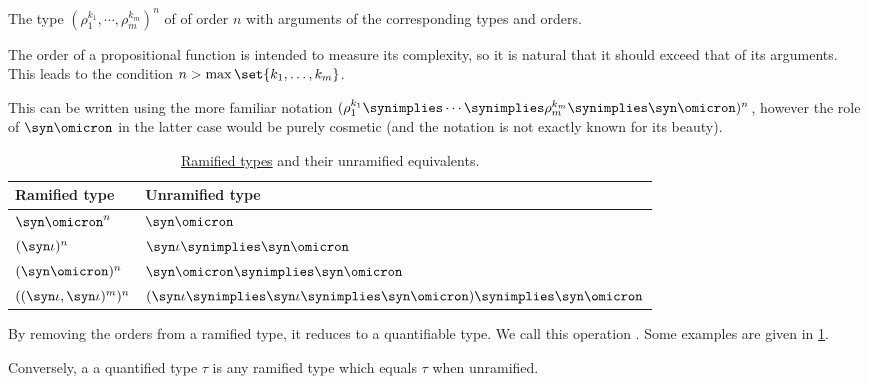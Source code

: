 \begin{definition}
\begin{thmenum}
\begin{thmenum}
       The type \( (\rho_1^{k_1}, \cdots, \rho_m^{k_m})^n \) of  of order \( n \) with arguments of the corresponding types and orders.

      The order of a propositional function is intended to measure its complexity, so it is natural that it should exceed that of its arguments. This leads to the condition \( n > \max\set{ k_1, \ldots, k_m } \).

      This can be written using the more familiar notation \( (\rho_1^{k_1} \synimplies \cdots \synimplies \rho_m^{k_m} \synimplies \syn\omicron)^n \), however the role of \( \syn\omicron \) in the latter case would be purely cosmetic (and the notation is not exactly known for its beauty).
    \end{thmenum}

    \begin{table}
      \begin{center}
        \begin{tabular}{l l}
          \toprule
          Ramified type                      & Unramified type \\
          \midrule
          \( \syn\omicron^n \)               & \( \syn\omicron \) \\
          \( (\syn\iota)^n \)                & \( \syn\iota \synimplies \syn\omicron \) \\
          \( (\syn\omicron)^n \)             & \( \syn\omicron \synimplies \syn\omicron \) \\
          \( ((\syn\iota, \syn\iota)^m)^n \) & \( (\syn\iota \synimplies \syn\iota \synimplies \syn\omicron)  \synimplies \syn\omicron \) \\
          \bottomrule
        \end{tabular}
      \end{center}

      \caption{\hyperref[def:ramified_theory_of_types/ramified_type]{Ramified types} and their unramified equivalents.}\label{tab:def:ramified_theory_of_types/ramified_type}
    \end{table}

    By removing the orders from a ramified type, it reduces to a quantifiable type. We call this operation . Some examples are given in \cref{tab:def:ramified_theory_of_types/ramified_type}.

    Conversely, a  a quantified type \( \tau \) is any ramified type which equals \( \tau \) when unramified.


\end{thmenum}
\end{definition}
